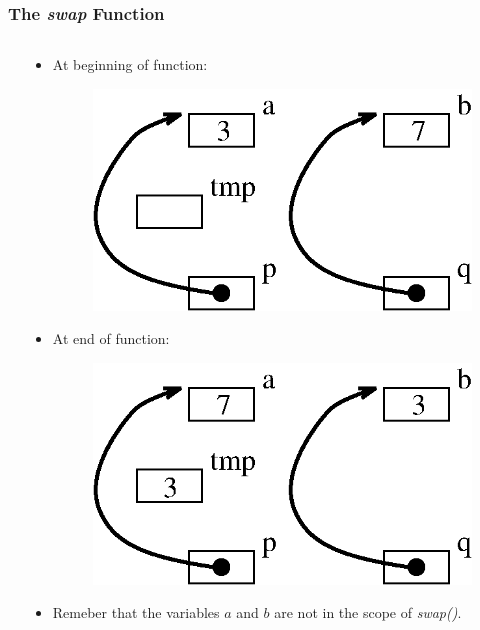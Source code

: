 \begin{frame}[fragile]
\frametitle{The {\em swap} Function}
\begin{columns}[T]

\begin{column}{0.45\textwidth}

\end{column}


\pause
\begin{column}{0.45\textwidth}
\begin{itemize}[<+->]
\item At beginning of function:
\begin{center}
\begin{figure}[h]
\centerline{
\includegraphics[scale=0.40]{../Figs/point8_7.eps}
}
\end{figure}
\end{center}

\item At end of function:
\begin{center}
\begin{figure}[h]
\centerline{
\includegraphics[scale=0.40]{../Figs/point8_8.eps}
}
\end{figure}
\end{center}
\item Remeber that the variables $a$ and $b$ are not in the scope of
{\em swap()}.
\end{itemize}

\end{column}

\end{columns}
\end{frame}


